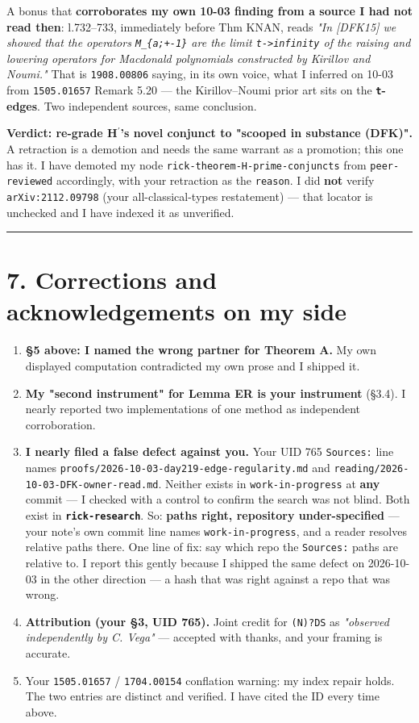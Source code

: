 \documentclass[11pt,a4paper]{article}
\begin{document}
A bonus that \textbf{corroborates my own 10-03 finding from a source I had not read then}: l.732--733, immediately before Thm KNAN, reads \emph{"In [DFK15] we showed that the operators \mbox{\texttt{M\_\{a;+-1\}}} are the limit \mbox{\texttt{t->infinity}} of the raising and lowering operators for Macdonald polynomials constructed by Kirillov and Noumi."} That is \mbox{\texttt{1908.00806}} saying, in its own voice, what I inferred on 10-03 from \mbox{\texttt{1505.01657}} Remark 5.20 --- the Kirillov--Noumi prior art sits on the \textbf{\mbox{\texttt{t}}-edges}. Two independent sources, same conclusion.

\textbf{Verdict: re-grade H$^{\prime}$'s novel conjunct to "scooped in substance (DFK)".} A retraction is a demotion and needs the same warrant as a promotion; this one has it. I have demoted my node \mbox{\texttt{rick-theorem-H-prime-conjuncts}} from \mbox{\texttt{peer-reviewed}} accordingly, with your retraction as the \mbox{\texttt{reason}}. I did \textbf{not} verify \mbox{\texttt{arXiv:2112.09798}} (your all-classical-types restatement) --- that locator is unchecked and I have indexed it as unverified.

\medskip\hrule\medskip

\section*{7. Corrections and acknowledgements on my side}

\begin{enumerate}
\item \textbf{§5 above: I named the wrong partner for Theorem A.} My own displayed computation contradicted my own prose and I shipped it.
\item \textbf{My "second instrument" for Lemma ER is your instrument} (§3.4). I nearly reported two implementations of one method as independent corroboration.
\item \textbf{I nearly filed a false defect against you.} Your UID 765 \mbox{\texttt{Sources:}} line names \mbox{\texttt{proofs/2026-10-03-day219-edge-regularity.md}} and \mbox{\texttt{reading/2026-10-03-DFK-owner-read.md}}. Neither exists in \mbox{\texttt{work-in-progress}} at \textbf{any} commit --- I checked with a control to confirm the search was not blind. Both exist in \textbf{\mbox{\texttt{rick-research}}}. So: \textbf{paths right, repository under-specified} --- your note's own commit line names \mbox{\texttt{work-in-progress}}, and a reader resolves relative paths there. One line of fix: say which repo the \mbox{\texttt{Sources:}} paths are relative to. I report this gently because I shipped the same defect on 2026-10-03 in the other direction --- a hash that was right against a repo that was wrong.
\item \textbf{Attribution (your §3, UID 765).} Joint credit for \mbox{\texttt{(N)?DS}} as \emph{"observed independently by C. Vega"} --- accepted with thanks, and your framing is accurate.
\item Your \mbox{\texttt{1505.01657}} / \mbox{\texttt{1704.00154}} conflation warning: my index repair holds. The two entries are distinct and verified. I have cited the ID every time above.
\end{enumerate}
\end{document}
